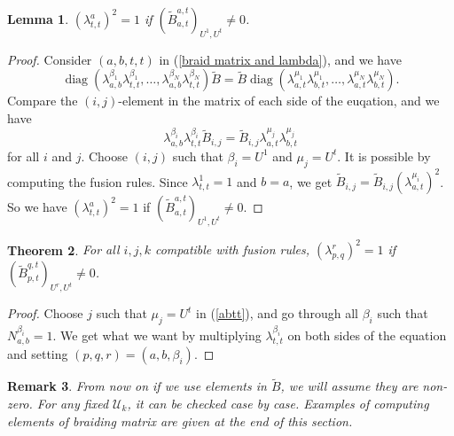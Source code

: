 \documentclass{article}
\newtheorem{lemma}{Lemma}[section]
\newtheorem{theorem}[lemma]{Theorem}
\newtheorem{remark}[lemma]{Remark}
\begin{document}
\begin{lemma}
$\left(\lambda_{t,t}^a\right)^2=1$ if $\left(\tilde{B}_{a,t}^{a,t}\right)_{U^1,U^t}\neq 0$.
\end{lemma}
\begin{proof}
Consider $(a,b,t,t)$ in (\ref{braid matrix and lambda}), and we have
$$
\operatorname{diag}(\lambda_{a,b}^{\beta_1}\lambda_{t,t}^{\beta_1},\ldots,\lambda_{a,b}^{\beta_N}\lambda_{t,t}^{\beta_N})\tilde{B}
=\tilde{B}\operatorname{diag}(\lambda_{a,t}^{\mu_1}\lambda_{b,t}^{\mu_1},\ldots,\lambda_{a,t}^{\mu_N}\lambda_{b,t}^{\mu_N}).$$
Compare the $(i,j)$-element in the matrix of each side of the euqation,
and we have 
\begin{equation}\label{abtt}
\lambda_{a,b}^{\beta_i}\lambda_{t,t}^{\beta_i}\tilde{B}_{i,j}=\tilde{B}_{i,j}\lambda_{a,t}^{\mu_j}\lambda_{b,t}^{\mu_j}
\end{equation}
for all $i$ and $j$.
Choose $(i,j)$ such that $\beta_i=U^1$ and $\mu_j=U^t$.
It is possible by computing the fusion rules.
Since $\lambda_{t,t}^1=1$ and $b=a$, 
we get $\tilde{B}_{i,j}=\tilde{B}_{i,j}\left(\lambda_{a,t}^{\mu_i}\right)^2$.
So we have $\left(\lambda_{t,t}^a\right)^2=1$ if 
$\left(\tilde{B}_{a,t}^{a,t}\right)_{U^1,U^t}\neq 0$. 
\end{proof}

\begin{theorem}\label{squarelambda}
For all $i,j,k$ compatible with fusion rules, 
$\left(\lambda_{p,q}^r\right)^2=1$ if 
$\left(\tilde{B}_{p,t}^{q,t}\right)_{U^r,U^t}\neq 0$.
\end{theorem}
\begin{proof}
Choose $j$ such that $\mu_j=U^t$ in (\ref{abtt}),
and go through all $\beta_i$ such that $N_{a,b}^{\beta_i}=1$.
We get what we want by multiplying $\lambda_{t,t}^{\beta_i}$ on both sides of the equation
and setting $(p,q,r)=(a,b,\beta_i)$.
\end{proof}

\begin{remark}\label{rmkB}
From now on if we use 
elements in $\tilde{B}$, we will assume they are non-zero.
For any fixed $\mathcal{U}_k$, it can be checked case by case. 
Examples of computing elements of braiding matrix are given at the end of this section.

\end{remark}
\end{document}
